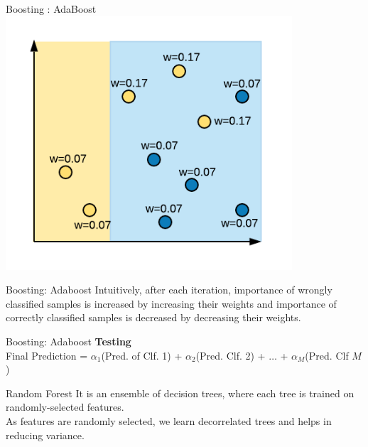 \documentclass{beamer}
\begin{document}
	\begin{frame}{Boosting : AdaBoost }
				\vspace{0.5cm}
				\centering
				\includegraphics[width = 0.8\textwidth]{ada_iter1_new_weights_normalized}
	\end{frame}
	
	\begin{frame}{Boosting: Adaboost}
	Intuitively, after each iteration, importance of wrongly classified samples is increased by increasing their weights and importance of correctly classified 		samples is decreased by decreasing their weights.
	\end{frame}
	
	\begin{frame}{Boosting: Adaboost}
	\textbf{Testing}\\
	Final Prediction = $\alpha_1$(Pred. of Clf. 1) +  $\alpha_2$(Pred. Clf. 2) + $\dots$ +  $\alpha_M$(Pred. Clf $M$)
	\end{frame}
	

	\begin{frame}{Random Forest}
		It is an ensemble of decision trees, where each tree is trained on randomly-selected features.\\
		\vspace{1cm}
		As features are randomly selected, we learn decorrelated trees and helps in reducing variance.\\
	\end{frame}
\end{document}
